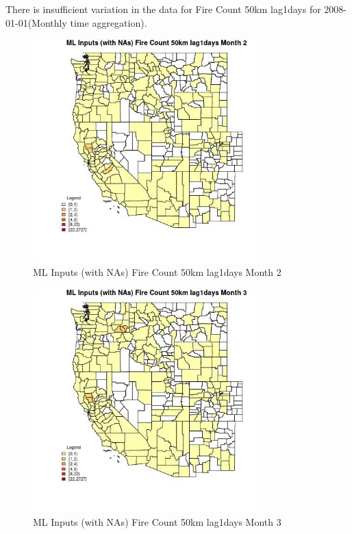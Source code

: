 There is insufficient variation in the data for Fire Count 50km lag1days for 2008-01-01(Monthly time aggregation). 
 

\begin{figure} 
\centering  
\includegraphics[width=0.77\textwidth]{Code_Outputs/Report_ML_input_PM25_Step4_part_f_de_duplicated_aveswNAs_CountyFire_Count_50km_lag1daysmedianMonth2.jpg} 
\caption{\label{fig:Report_ML_input_PM25_Step4_part_f_de_duplicated_aveswNAsCountyFire_Count_50km_lag1daysmedianMonth2}ML Inputs (with NAs) Fire Count 50km lag1days Month 2} 
\end{figure} 
 

\begin{figure} 
\centering  
\includegraphics[width=0.77\textwidth]{Code_Outputs/Report_ML_input_PM25_Step4_part_f_de_duplicated_aveswNAs_CountyFire_Count_50km_lag1daysmedianMonth3.jpg} 
\caption{\label{fig:Report_ML_input_PM25_Step4_part_f_de_duplicated_aveswNAsCountyFire_Count_50km_lag1daysmedianMonth3}ML Inputs (with NAs) Fire Count 50km lag1days Month 3} 
\end{figure} 
 

